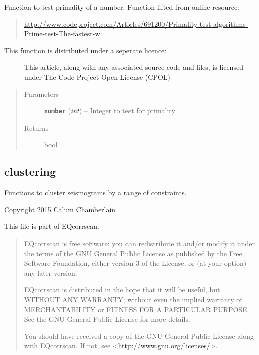 \documentclass[a4paper,10pt,english]{sphinxmanual}
\begin{document}
\begin{fulllineitems}
\label{submodules/utils.findpeaks:findpeaks.is_prime}
Function to test primality of a number. Function lifted from online resource:
\begin{quote}

\href{http://www.codeproject.com/Articles/691200/Primality-test-algorithms-Prime-test-The-fastest-w}{http://www.codeproject.com/Articles/691200/Primality-test-algorithms-Prime-test-The-fastest-w}
\end{quote}
\begin{description}
\item[{This function is distributed under a seperate licence:}] \leavevmode
This article, along with any associated source code and files, is
licensed under The Code Project Open License (CPOL)

\end{description}
\begin{quote}\begin{description}
\item[{Parameters}] \leavevmode
\textbf{\texttt{number}} (\href{https://docs.python.org/library/functions.html\#int}{\emph{int}}) -- Integer to test for primality

\item[{Returns}] \leavevmode
bool

\end{description}\end{quote}

\end{fulllineitems}



\subsection{clustering}
\label{submodules/utils.clustering:clustering}\label{submodules/utils.clustering:module-clustering}\label{submodules/utils.clustering::doc}
Functions to cluster seismograms by a range of constraints.

Copyright 2015 Calum Chamberlain

This file is part of EQcorrscan.
\begin{quote}

EQcorrscan is free software: you can redistribute it and/or modify
it under the terms of the GNU General Public License as published by
the Free Software Foundation, either version 3 of the License, or
(at your option) any later version.

EQcorrscan is distributed in the hope that it will be useful,
but WITHOUT ANY WARRANTY; without even the implied warranty of
MERCHANTABILITY or FITNESS FOR A PARTICULAR PURPOSE.  See the
GNU General Public License for more details.

You should have received a copy of the GNU General Public License
along with EQcorrscan.  If not, see \textless{}\href{http://www.gnu.org/licenses/}{http://www.gnu.org/licenses/}\textgreater{}.
\end{quote}
\end{document}
